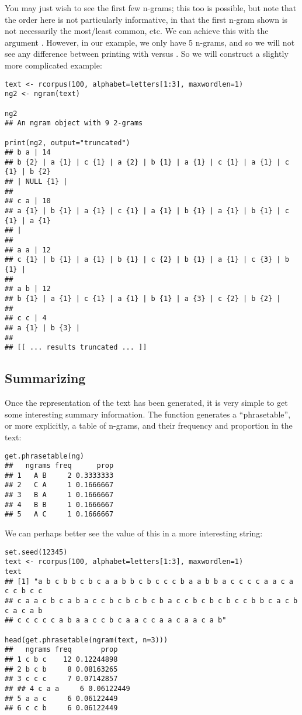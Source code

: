You may just wish to see the first few n-grams; this too is possible, but
note that the order here is not particularly
informative, in that the first n-gram shown is not necessarily the most/least
common, etc.  We can achieve this with the  argument 
.  However, in our example, we only have 5 n-grams,
and so we will not see any difference between printing with 
versus .  So we will construct a slightly more
complicated example:

\begin{lstlisting}[language=rr]
text <- rcorpus(100, alphabet=letters[1:3], maxwordlen=1)
ng2 <- ngram(text)

ng2
## An ngram object with 9 2-grams 
 
print(ng2, output="truncated")
## b a | 14 
## b {2} | a {1} | c {1} | a {2} | b {1} | a {1} | c {1} | a {1} | c {1} | b {2} 
## | NULL {1} | 
## 
## c a | 10 
## a {1} | b {1} | a {1} | c {1} | a {1} | b {1} | a {1} | b {1} | c {1} | a {1} 
## | 
## 
## a a | 12 
## c {1} | b {1} | a {1} | b {1} | c {2} | b {1} | a {1} | c {3} | b {1} | 
## 
## a b | 12 
## b {1} | a {1} | c {1} | a {1} | b {1} | a {3} | c {2} | b {2} | 
## 
## c c | 4 
## a {1} | b {3} | 
## 
## [[ ... results truncated ... ]]
\end{lstlisting}


\subsection{Summarizing}

Once the  representation of the text has been generated, it is very 
simple to get some interesting summary information.  The function 
 generates a ``phrasetable'', or more explicitly, a 
table of n-grams, and their frequency and proportion in the text:

\begin{lstlisting}[language=rr]
get.phrasetable(ng)
##   ngrams freq      prop
## 1   A B     2 0.3333333
## 2   C A     1 0.1666667
## 3   B A     1 0.1666667
## 4   B B     1 0.1666667
## 5   A C     1 0.1666667
\end{lstlisting}
We can perhaps better see the value of this in a more interesting string:

\begin{lstlisting}[language=rr]
set.seed(12345)
text <- rcorpus(100, alphabet=letters[1:3], maxwordlen=1)
text
## [1] "a b c b b c b c a a b b c b c c c b a a b b a c c c c a a c a c c b c c 
## c a a c b c a b a c c b c b c b c b a c c b c b c b c c b b c a c b c a c a b 
## c c c c c a b a a c c b c a a c c a a c a a c a b"

head(get.phrasetable(ngram(text, n=3)))
##   ngrams freq       prop
## 1 c b c    12 0.12244898
## 2 b c b     8 0.08163265
## 3 c c c     7 0.07142857
## ## 4 c a a     6 0.06122449
## 5 a a c     6 0.06122449
## 6 c c b     6 0.06122449
\end{lstlisting}

